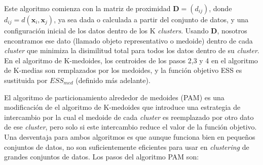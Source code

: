 \documentclass[a4paper, 20pt]{article}
\begin{document}
Este algoritmo comienza con la matriz de proximidad $\textbf{D}=(d_{ij})$, donde $d_{ij}=d(\textbf{x}_i,\textbf{x}_j)$, ya sea dada o calculada a partir del conjunto de datos, y una configuración inicial de los datos dentro de los K \textit{clusters}. Usando \textbf{D}, nosotros encontramos ese dato (llamado objeto representativo o medoide) dentro de cada \textit{cluster} que minimiza la disimilitud total para todos los datos dentro de su \textit{cluster}. En el algoritmo de K-medoides, los centroides de los pasos 2,3 y 4 en el algoritmo de K-medias son remplazados por los medoides, y la función objetivo ESS es sustituida por $ESS_{med}$ (definido más adelante).

El algoritmo de particionamiento alrededor de medoides (PAM) es una modificación de el algoritmo de K-medoides que introduce una estrategia de intercambio por la cual el medoide de cada \textit{cluster} es reemplazado por otro dato de ese \textit{cluster}, pero solo si este intercambio reduce el valor de la función objetivo. Una desventaja para ambos algoritmos es que aunque funciona bien en pequeños conjuntos de datos, no son suficientemente eficientes para usar en \textit{clustering} de grandes conjuntos de datos. Los pasos del algoritmo PAM son:
\end{document}

